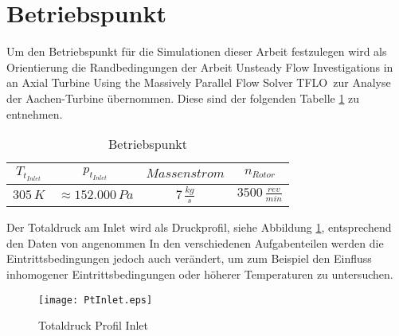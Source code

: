 \section{Betriebspunkt}
\label{subsec:aachensetup}
Um den Betriebspunkt für die Simulationen dieser Arbeit festzulegen wird als Orientierung die Randbedingungen der Arbeit \glqq Unsteady Flow Investigations in an
Axial Turbine Using the Massively
Parallel Flow Solver TFLO\grqq \, \cite{ufi2001YaoDavis} zur Analyse der Aachen-Turbine übernommen. Diese sind der folgenden Tabelle \ref{tab:aachensetup} zu entnehmen.
\begin{table}[H]
\centering
\caption{Betriebspunkt} \label{tab:aachensetup}
\begin{tabular}{ c| c| c| c}
$T_{t_{Inlet}}$&$p_{t_{Inlet}}$&$Massenstrom$&$n_{Rotor}$\\
\hline
$305 \, K$&$\approx152.000 \, Pa$&$7 \, \frac{kg}{s}$&$3500 \, \frac{rev}{min}$\\
\end{tabular}
\end{table}
Der Totaldruck am Inlet wird als Druckprofil, siehe Abbildung \ref{fig:ptinlet}, entsprechend den Daten von \cite[p. 4]{ufi2001YaoDavis} angenommen
In den verschiedenen Aufgabenteilen werden die Eintrittsbedingungen jedoch auch verändert, um zum Beispiel den Einfluss inhomogener Eintrittsbedingungen oder höherer Temperaturen zu untersuchen.

\begin{figure}[H]
	\centering
	\texttt{[image: PtInlet.eps]}
	\caption{Totaldruck Profil Inlet} \label{fig:ptinlet}
\end{figure}







